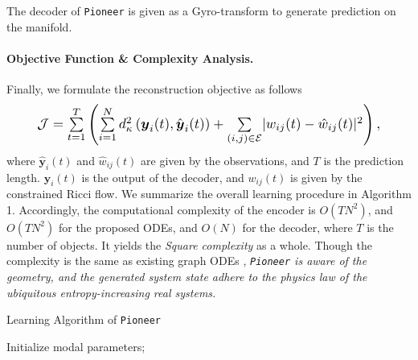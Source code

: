 The decoder of \texttt{Pioneer} is given as a Gyro-transform to generate prediction on the manifold.


\paragraph{Objective Function \& Complexity Analysis.}  
Finally, we formulate the reconstruction objective as follows
\begin{align}
\resizebox{0.888\hsize}{!}{$
\mathcal J=\sum\limits_{t=1}^T\left(\sum\limits_{i=1}^N d^2_\kappa\left(\boldsymbol y_i(t), \hat{\boldsymbol y}_i(t)\right) + \sum\limits_{(i,j)\in\mathcal E} \lvert w_{ij}(t)-\hat{w}_{ij}(t) \rvert^2\right),
$}
\label{ObjectiveFunc}
\end{align}
where $\hat{\boldsymbol y}_i(t)$ and $\hat{w}_{ij}(t)$ are given by the observations, and $T$ is the prediction length.
$\boldsymbol y_i(t)$ is the output of the decoder, and $w_{ij}(t)$ is given by the constrained Ricci flow.
We summarize the overall learning procedure  in Algorithm 1.
Accordingly, 
the computational complexity of the encoder is $O(TN^2)$, and $O(TN^2)$ for the proposed ODEs, and $O(N)$ for the decoder,
where $T$ is the number of objects.
It yields the \emph{Square complexity} as a whole.
Though the complexity is the same as existing graph ODEs \cite{kdd23GGODE,aaai24ChenWLLsigned},
\emph{\texttt{Pioneer} is aware of the geometry, 
and the generated system state adhere to the physics law of the ubiquitous entropy-increasing real systems.}


\begin{algorithm}[t]
        \caption{Learning Algorithm of  \texttt{Pioneer}} 
        Initialize modal parameters;

\end{algorithm}

